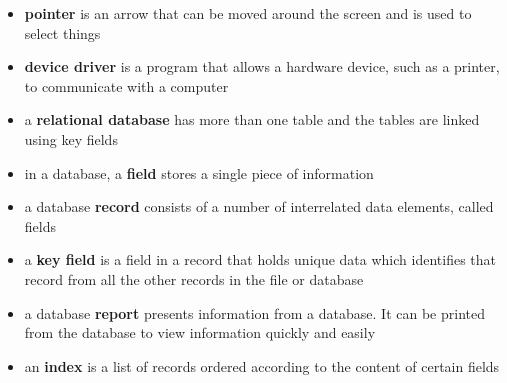 \documentclass[a4paper,8pt]{article}
\begin{document}
\begin{itemize}
\item \textbf{pointer} is an arrow that can be moved around the screen and
is used to select things
\item \textbf{device driver} is a program that allows a hardware device,
such as a printer, to communicate with a computer
\item a \textbf{relational database} has more than one table and the tables are linked using key fields
\item in a database, a \textbf{field} stores a single piece of information
\item a database \textbf{record} consists of a number of interrelated data elements, called fields
\item a \textbf{key field} is a field in a record that holds unique data which identifies that record from all the 
other records in the file or database
\item a database \textbf{report} presents information from a database. It can be printed from the database
to view information quickly and easily 
\item an \textbf{index} is a list of records ordered according to the content of certain fields 
\end{itemize}
\end{document}
